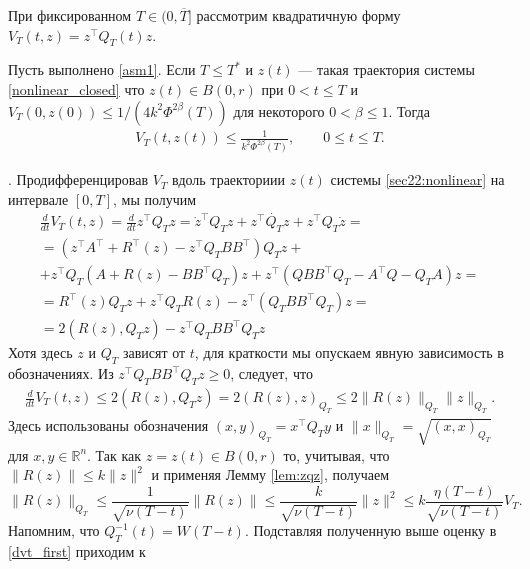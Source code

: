 \documentclass[../main.tex]{subfiles}
\begin{document}
При фиксированном $T\in (0, \overline{T}]$ рассмотрим квадратичную форму $V_T(t,z)=z^{\top}Q_T(t)z$.  
\begin{lemma}\label{lem:vest}
 Пусть выполнено \ref{asm1}. Если $T\leqslant T^*$ и $z(t)$ --- такая траектория системы \eqref{nonlinear_closed} что  $z(t)  \in B(0,r)$ при $0<t \leqslant T$ и $V_T(0,z(0))\leqslant 1/(4k^2\Phi^{2\beta}(T))$ для некоторого $0<\beta \leqslant 1$. 
 Тогда 
 \begin{gather*}
    V_T(t,z(t)) \leqslant \frac{1}{k^2\Phi^{2\beta}(T)}, \qquad 0 \leqslant t \leqslant T. 
 \end{gather*}
\end{lemma}
\doc. 
Продифференцировав $V_T$ вдоль траекториии $z(t)$ системы \eqref{sec22:nonlinear}  на интервале $[0, T]$, мы получим
\begin{gather*}
    \frac{d}{dt}V_T(t,z) = \frac{d}{dt}z^{\top}Q_Tz = \dot{z}^{\top} Q_T z + z^{\top} \dot{Q_T} z + z^{\top} Q_T \dot{z} = \\
    =\left(z^{\top} A^{\top} + R^{\top}(z)- z^{\top} Q_T B B^{\top}\right) Q_T z + \\ +
		z^{\top} Q_T \left(A +R(z) - B B^{\top} Q_T\right)z + z^{\top} \left(Q B B^{\top} Q_T - A^{\top}Q - Q_T A \right) z = \\
    = R^{\top}(z)Q_T z + z^{\top} Q_T R(z) - z^{\top} (Q_T B B^{\top} Q_T) z = \\
    = 2 \left( R(z), Q_Tz \right) - z^{\top} Q_T B B^{\top} Q_T z 
\end{gather*}
Хотя здесь $z$ и $Q_T$ зависят от $t$, для краткости мы опускаем явную зависимость в обозначениях.  
Из $z^{\top} Q_T B B^{\top} Q_T z\geqslant 0$, следует, что
\begin{gather}\label{dvt_first}
    \frac{d}{dt}V_T(t,z) \leqslant 2 \left( R(z), Q_T z\right)=2(R(z),z)_{Q_T} \leqslant 2 \| R(z) \|_{Q_T} \| z \|_{Q_T}.
\end{gather}
Здесь использованы обозначения $(x,y)_{Q_T}=x^\top Q_Ty$ и  $\| x \|_{Q_T} =\sqrt{(x,x)_{Q_T}}$ для $x,y\in \mathbb R^n$. 
Так как $z = z(t) \in B(0,r)$ то, учитывая, что $\|R(z)\| \leqslant k\|z\|^2$  и применяя Лемму \ref{lem:zqz}, получаем 
\begin{equation}\label{rqr_est}
     \| R(z) \|_{Q_T} \leqslant \frac{1}{\sqrt{\nu(T - t)}} \|R(z)\| \leqslant \frac{k}{\sqrt{\nu(T - t)}}\|z\|^2 \leqslant k \frac{\eta(T-t)}{\sqrt{\nu(T-t)}}V_T.
\end{equation}
Напомним, что  $ Q_T^{-1}(t) = W(T-t) $.
Подставляя полученную выше оценку в \eqref{dvt_first} приходим к
\end{document}
